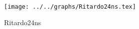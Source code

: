 \begin{figure}[h] \centering \texttt{[image: ../../graphs/Ritardo24ns.tex]}\caption{Ritardo24ns}\label{gr:Ritardo24ns} \end{figure}
